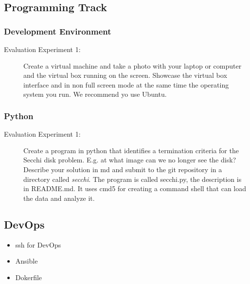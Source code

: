 \subsection{Programming Track}

\subsubsection{Development Environment}



\begin{description}
\item[Evaluation Experiment 1:] Create a virtual machine and take a
  photo with your laptop or computer and the virtual box running on
  the screen. Showcase the virtual box interface and in non full
  screen mode at the same time the operating system you run. We
  recommend yo use Ubuntu.
\end{description}

\subsubsection{Python}



\begin{description}
\item[Evaluation Experiment 1:] Create a program in python that
  identifies a termination criteria for the Secchi disk
  problem. E.g. at what image can we no longer see the disk?
  Describe your solution in md and submit to the git repository in a
  directory called \textit{secchi}. The program is called secchi.py, the
  description is in README.md. It uses cmd5 for creating a command
  shell that can load the data and analyze it. 
\end{description}

\subsection{DevOps}

\begin{itemize}
\item ssh for DevOps
\item Ansible
\item Dokerfile
\end{itemize}

